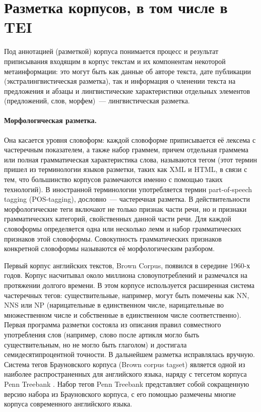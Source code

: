 \documentclass[12pt]{article}
\theoremstyle{definition}
\theoremstyle{remark}
\numberwithin{equation}{section}
\begin{document}
\section{Разметка корпусов, в том числе в TEI}

Под аннотацией (разметкой) корпуса понимается процесс и результат приписывания входящим в корпус текстам и их компонентам некоторой метаинформации: это могут быть как данные об авторе текста, дате публикации (экстралингвистическая разметка), так и информация о членении текста на предложения и абзацы и лингвистические характеристики отдельных элементов (предложений, слов, морфем)~--- лингвистическая разметка.

\paragraph{Морфологическая разметка.} Она касается уровня словоформ: каждой словоформе приписывается её лексема с частеречным показателем, а также набор граммем, причем отдельная граммема или полная грамматическая характеристика слова, называются тегом (этот термин пришел из терминологии языков разметки, таких как XML и HTML, в связи с тем, что большинство корпусов размечаются именно с помощью таких технологий). В иностранной терминологии употребляется термин part-of-speech tagging (POS-tagging), дословно~--- частеречная разметка. В действительности морфологические теги включают не только признак части речи, но и признаки грамматических категорий, свойственных данной части речи. Для каждой словоформы определяется одна или несколько лемм и набор грамматических признаков этой словоформы. Совокупность грамматических признаков конкретной словоформы называются её морфологическим разбором.

Первый корпус английских текстов, Brown Corpus, появился в середине 1960-х годов. Корпус насчитывал около миллиона словоупотреблений и размечался на протяжении долгого времени. В этом корпусе используется расширенная система частеречных тегов: существительные, например, могут быть помечены как NN, NNS или NP (нарицательные в единственном числе, нарицательные во множественном числе и собственные в единственном числе соответственно). Первая программа разметки состояла из описания правил совместного употребления слов (например, слово после артикля могло быть существительным, но не могло быть глаголом) и достигала семидесятипроцентной точности. В дальнейшем разметка исправлялась вручную. Система тегов Брауновского корпуса (Brown corpus tagset)  является одной из наиболее распространенных для английского языка, наряду с тегсетом корпуса Penn Treebank . Набор тегов Penn Treebank представляет собой сокращенную версию набора из Брауновского корпуса, с его помощью размечены многие корпуса современного английского языка.
\end{document}
